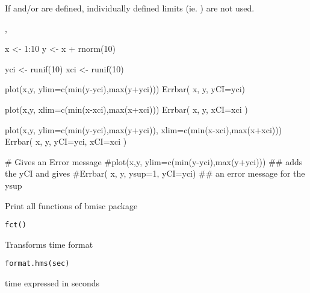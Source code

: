 \documentclass[a4paper]{book}
\begin{document}
%
\begin{Details}\relax
If  and/or  are defined, individually defined limits (ie. ) are not used.
\end{Details}
%
\begin{SeeAlso}\relax
{}, 
\end{SeeAlso}
%
\begin{Examples}
\begin{ExampleCode}
x <- 1:10
y <- x + rnorm(10)

yci <- runif(10)
xci <- runif(10)

plot(x,y, ylim=c(min(y-yci),max(y+yci)))
Errbar( x, y, yCI=yci)

plot(x,y, xlim=c(min(x-xci),max(x+xci)))
Errbar( x, y, xCI=xci )

plot(x,y, ylim=c(min(y-yci),max(y+yci)), xlim=c(min(x-xci),max(x+xci)))
Errbar( x, y, yCI=yci, xCI=xci )

# Gives an Error message
#plot(x,y, ylim=c(min(y-yci),max(y+yci)))  ## adds the yCI and gives
#Errbar( x, y, ysup=1, yCI=yci)            ## an error message for the ysup

\end{ExampleCode}
\end{Examples}
\newpage
{}
%
\begin{Description}\relax
Print all functions of bmisc package
\end{Description}
%
\begin{Usage}
\begin{verbatim}
fct()
\end{verbatim}
\end{Usage}
\newpage
{}
%
\begin{Description}\relax
Transforms time format
\end{Description}
%
\begin{Usage}
\begin{verbatim}
format.hms(sec)
\end{verbatim}
\end{Usage}
%
\begin{Arguments}
\begin{ldescription}
\item[\code{sec}] time expressed in seconds

\end{ldescription}
\end{Arguments}
\end{document}
